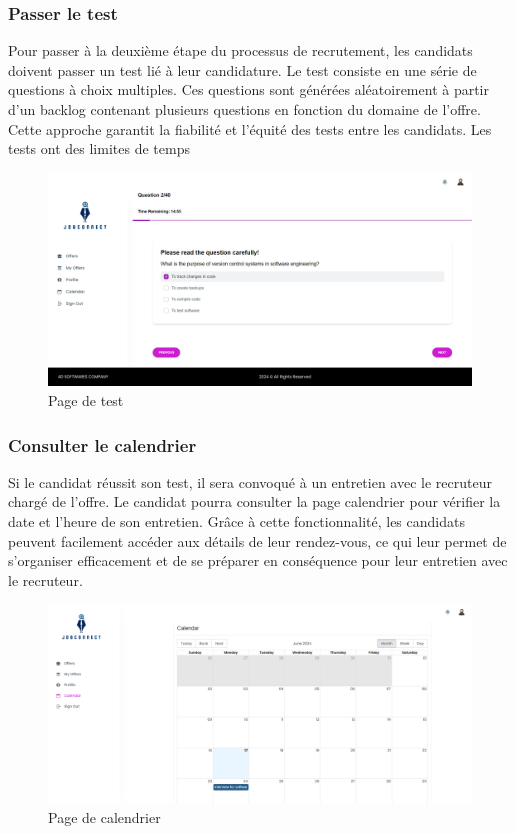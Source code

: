 \subsubsection{Passer le test}
Pour passer à la deuxième étape du processus de recrutement, les candidats doivent passer un test lié à leur candidature.
 Le test consiste en une série de questions à choix multiples.
 Ces questions sont générées aléatoirement à partir d'un backlog contenant plusieurs questions en fonction du domaine de l'offre.
 Cette approche garantit la fiabilité et l'équité des tests  entre les candidats.
 Les tests ont des limites de temps 
\begin{figure}[htbp]
   \centering
   \includegraphics[scale=0.2]{screens/test.png} 
   \caption{Page de test}
   \label{fig:listOffers}
\end{figure}

\subsubsection{Consulter le calendrier}

Si le candidat réussit son test, il sera convoqué à un entretien avec le recruteur chargé de l'offre. Le candidat pourra consulter la page calendrier pour vérifier la date et l'heure de son entretien. Grâce à cette fonctionnalité, les candidats peuvent facilement accéder aux détails de leur rendez-vous, ce qui leur permet de s'organiser efficacement et de se préparer en conséquence pour leur entretien avec le recruteur.
\begin{figure}[htbp]
   \centering
   \includegraphics[scale=0.2]{screens/calendarCand.png} 
   \caption{Page de calendrier}
   \label{fig:listOffers}
\end{figure}


